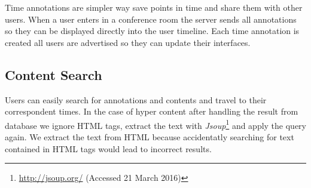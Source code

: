 	Time annotations are simpler way save points in time and share them with other users. When a user enters in a conference room the server sends all annotations so they can be displayed directly into the user timeline. Each time annotation is created all users are advertised so they can update their interfaces.

	\subsection{Content Search}

	Users can easily search for annotations and contents and travel to their correspondent times. In the case of hyper content after handling the result from database we ignore \ac{HTML} tags, extract the text with \emph{Jsoup}\footnote{\url{http://jsoup.org/} (Accessed 21 March 2016)} and apply the query again. We extract the text from \ac{HTML} because accidentatly searching for text contained in \ac{HTML} tags would lead to incorrect results.